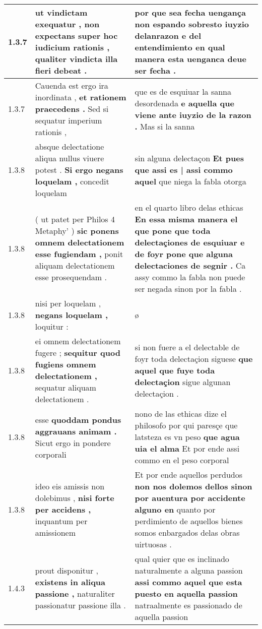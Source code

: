 \begin{tabular}{|p{1cm}|p{6.5cm}|p{6.5cm}|}
1.3.7 & ut vindictam exequatur , \textbf{ non expectans super hoc iudicium rationis , } qualiter vindicta illa fieri debeat . & por que sea fecha uengança \textbf{ non espando sobresto iuyzio delanrazon e del entendimiento } en qual manera esta uenganca deue ser fecha . \\\hline
1.3.7 & Cauenda est ergo ira inordinata , \textbf{ et rationem praecedens . } Sed si sequatur imperium rationis , & que es de esquiuar la sanna desordenada \textbf{ e aquella que viene ante iuyzio de la razon . } Mas si la sanna \\\hline
1.3.8 & absque delectatione aliqua nullus viuere potest . \textbf{ Si ergo negans loquelam , } concedit loquelam & sin alguna delectaçon \textbf{ Et pues que assi es | assi commo aquel } que niega la fabla otorga \\\hline
1.3.8 & ( ut patet per Philos 4 Metaphy’ ) \textbf{ sic ponens omnem delectationem esse fugiendam , } ponit aliquam delectationem esse prosequendam . & en el quarto libro delas ethicas \textbf{ En essa misma manera el que pone que toda delectaçiones de esquiuar e de foyr pone que alguna delectaciones de segnir . } Ca assy commo la fabla non puede ser negada sinon por la fabla . \\\hline
1.3.8 & nisi per loquelam , \textbf{ negans loquelam , } loquitur : & ø \\\hline
1.3.8 & ei omnem delectationem fugere ; \textbf{ sequitur quod fugiens omnem delectationem , } sequatur aliquam delectationem . & si non fuere a el delectable de foyr toda delectaçion siguese \textbf{ que aquel que fuye toda delectaçion } sigue algunan delectaçion . \\\hline
1.3.8 & esse \textbf{ quoddam pondus aggrauans animam . } Sicut ergo in pondere corporali & nono de las ethicas dize el philosofo por qui paresçe que latsteza es vn peso \textbf{ que agua uia el alma } Et por ende assi commo en el peso corporal \\\hline
1.3.8 & ideo eis amissis non dolebimus , \textbf{ nisi forte per accidens , } inquantum per amissionem & Et por ende aquellos perdudos \textbf{ non nos dolemos dellos sinon por auentura por accidente alguno en } quanto por perdimiento de aquellos bienes somos enbargados delas obras uirtuosas . \\\hline
1.4.3 & prout disponitur , \textbf{ existens in aliqua passione , } naturaliter passionatur passione illa . & qual quier que es inclinado naturalmente a alguna passion \textbf{ assi commo aquel que esta puesto en aquella passion } natraalmente es passionado de aquella passion \\\hline

\end{tabular}
